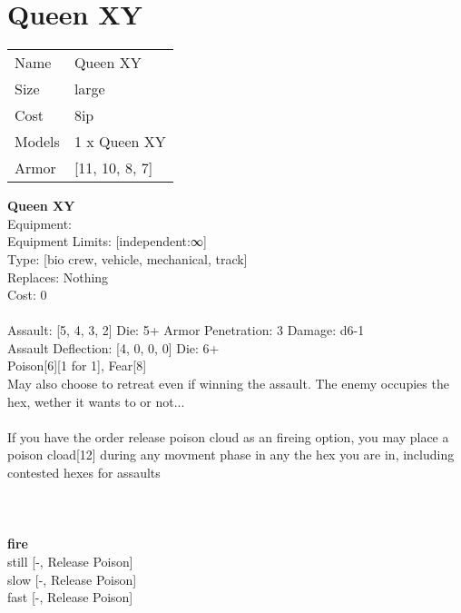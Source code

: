 \pagebreak\pagebreak

\section{ Queen XY }

\begin{tabular}{ll}
  Name & Queen XY \\
  Size & large\\
  Cost & 8ip\\
  Models & 1 x Queen XY\\
  Armor & [11, 10, 8, 7]\\
\end{tabular}

\noindent 

{\bf Queen XY } \\
Equipment:  \\
Equipment Limits: [independent:∞] \\
Type: [bio crew, vehicle, mechanical, track] \\
Replaces: Nothing \\
Cost: 0\\
\ \\
Assault: [5, 4, 3, 2] Die: 5+ Armor Penetration: 3 Damage: d6-1 \\
Assault Deflection: [4, 0, 0, 0] Die: 6+\\
\indent Poison[6][1 for 1], Fear[8]\\ 
May also choose to retreat even if winning the assault. The enemy occupies the hex, wether it wants to or not...\\ 
 
\ \\
If you have the order release poison cloud as an fireing option, you may place a poison cload[12] during any movment phase in any the hex you are in, including contested hexes for assaults\\ 

\ \\
 
\ \\



\ \\ {\bf fire } \\
still [-, Release Poison] \\
slow [-, Release Poison] \\
fast [-, Release Poison] \\


